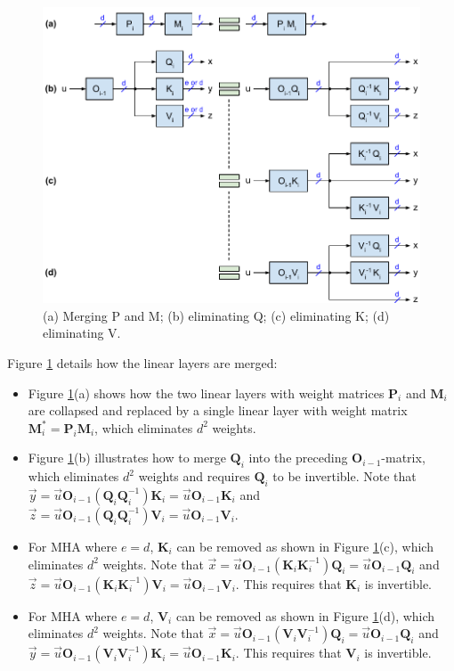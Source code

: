 \documentclass{article}
\newcommand{\mat}[1]{\mathbf{#1}}  %
\def\Q{\mat{Q}_i}
\def\K{\mat{K}_i}
\def\V{\mat{V}_i}
\def\P{\mat{P}_i}
\def\O{\mat{O}_{i-1}}
\def\M{\mat{M}_i}
\def\u{\vec{u}}
\def\x{\vec{x}}
\def\y{\vec{y}}
\def\z{\vec{z}}
\begin{document}
\begin{figure}[h!] \centering %
  \includegraphics[scale=0.92]{../doc/fig/removeWeights_fig2.pdf}
  \caption{(a) Merging P and M; (b) eliminating Q; (c) eliminating K; (d) eliminating V.}
\label{fig2} \end{figure}

Figure \ref{fig2} details how the linear layers are merged:
\begin{itemize}[topsep=-1pt, itemsep=-1pt]
  \item Figure \ref{fig2}(a) shows how the two linear layers with weight matrices $\P$ and $\M$ are collapsed and replaced by a single linear layer with weight matrix $\M^* = \P \M$, which eliminates $d^2$ weights.
  \item Figure \ref{fig2}(b) illustrates how to merge $\Q$ into the preceding $\O$-matrix, which eliminates $d^2$ weights and requires $\Q$ to be invertible. Note that $\y = \u \O (\Q \Q^{-1}) \K = \u \O \K$ and $\z = \u \O (\Q \Q^{-1}) \V = \u \O \V$.
  \item For MHA where $e = d$, $\K$ can be removed as shown in Figure \ref{fig2}(c), which eliminates $d^2$ weights. Note that $\x = \u \O (\K \K^{-1}) \Q = \u \O \Q$ and $\z = \u \O (\K \K^{-1}) \V = \u \O \V$. This requires that $\K$ is invertible.
  \item For MHA where $e = d$, $\V$ can be removed as shown in Figure \ref{fig2}(d), which eliminates $d^2$ weights. Note that $\x = \u \O (\V \V^{-1}) \Q = \u \O \Q$ and $\y = \u \O (\V \V^{-1}) \K = \u \O \K$. This requires that $\V$ is invertible.
\end{itemize}
\end{document}
